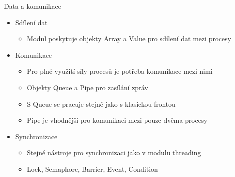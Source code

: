 \documentclass{beamer}
\begin{document}
\begin{frame}{Data a komunikace}
    \begin{itemize}
        \item Sdílení dat
        \begin{itemize}
            \item Modul poskytuje objekty Array a Value pro sdílení dat mezi procesy
        \end{itemize}

        \item Komunikace
        \begin{itemize}
            \item Pro plné využití síly procesů je potřeba komunikace mezi nimi
            \item Objekty Queue a Pipe pro zasílání zpráv
            \item S Queue se pracuje stejně jako s klasickou frontou
            \item Pipe je vhodnější pro komunikaci mezi pouze dvěma procesy
        \end{itemize}
        \item Synchronizace
        \begin{itemize}
            \item Stejné nástroje pro synchronizaci jako v modulu threading
            \item Lock, Semaphore, Barrier, Event, Condition
        \end{itemize}
    \end{itemize}
\end{frame}
\end{document}
